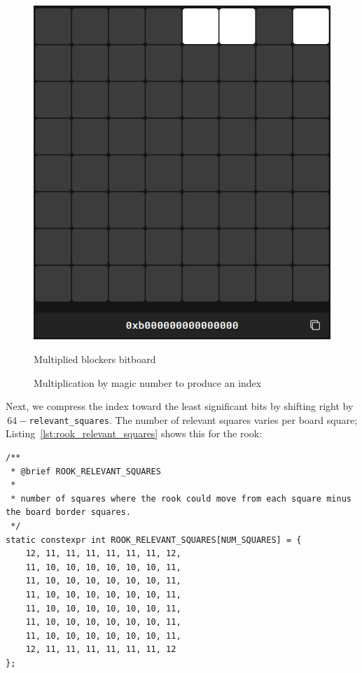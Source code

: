 \begin{figure}[H]
\begin{minipage}[c]{0.4\textwidth}
        \includegraphics[width=\textwidth]{Imagenes/magics_multiplied_blockers.png}
        \caption*{Multiplied blockers bitboard}
    \end{minipage}
    \caption{Multiplication by magic number to produce an index}
    \label{fig:magic_multiplication}
\end{figure}

\noindent Next, we compress the index toward the least significant bits by shifting right by \(\,64-\)\texttt{relevant\_squares}. The number of relevant squares varies per board square; Listing~\ref{lst:rook_relevant_squares} shows this for the rook:

\begin{lstlisting}[breaklines=true, caption={Number of relevant squares for each rook square}, label={lst:rook_relevant_squares}]
/**
 * @brief ROOK_RELEVANT_SQUARES
 * 
 * number of squares where the rook could move from each square minus the board border squares.
 */
static constexpr int ROOK_RELEVANT_SQUARES[NUM_SQUARES] = {
    12, 11, 11, 11, 11, 11, 11, 12,
    11, 10, 10, 10, 10, 10, 10, 11,
    11, 10, 10, 10, 10, 10, 10, 11,
    11, 10, 10, 10, 10, 10, 10, 11,
    11, 10, 10, 10, 10, 10, 10, 11,
    11, 10, 10, 10, 10, 10, 10, 11,
    11, 10, 10, 10, 10, 10, 10, 11,
    12, 11, 11, 11, 11, 11, 11, 12
};
\end{lstlisting}

